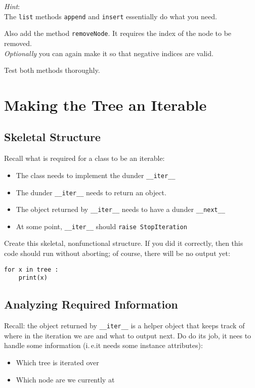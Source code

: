 \documentclass[
	english,
	fontsize=10pt,
	parskip=half,
	titlepage=true,
	DIV=12
]{scrartcl}
\newcommand*{\inPy}[1]{\texttt{#1}}
\newcommand*{\ie}{i.\,e.}
\begin{document}
\emph{Hint}:\\
The \inPy{list} methods \texttt{append} and \texttt{insert} essentially do what you need.

Also add the method \texttt{removeNode}. It requires the index of the node to be removed.\\
\emph{Optionally} you can again make it so that negative indices are valid.

Test both methods thoroughly.

\section{Making the Tree an Iterable}
\subsection{Skeletal Structure}
Recall what is required for a class to be an iterable:
\begin{itemize}
\item The class needs to implement the dunder \inPy{__iter__}
\item The dunder \inPy{__iter__} needs to return an object.
\item The object returned by \inPy{__iter__} needs to have a dunder \inPy{__next__}
\item At some point, \inPy{__iter__} should \inPy{raise StopIteration}
\end{itemize}

Create this skeletal, nonfunctional structure. If you did it correctly, then this code should run without aborting; of course, there will be no output yet:
\begin{verbatim}
for x in tree :
    print(x)
\end{verbatim}

\subsection{Analyzing Required Information}
Recall: the object returned by \inPy{__iter__} is a helper object that keeps track of where in the iteration we are and what to output next. Do do its job, it nees to handle some information (\ie it needs some instance attributes):
\begin{itemize}
\item Which tree is iterated over
\item Which node are we currently at
\end{itemize}
\end{document}

